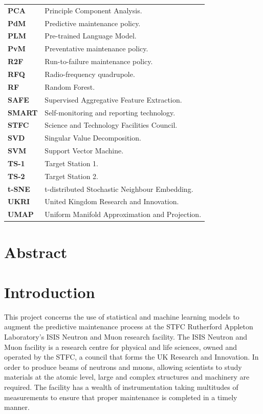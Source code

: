 \documentclass[10pt,oneside]{report}
\begin{document}
\begin{table}[ht]
\begin{tabular}{ll}
        \textbf{PCA} & Principle Component Analysis. \\
        \textbf{PdM} & Predictive maintenance policy. \\
        \textbf{PLM} & Pre-trained Language Model. \\
        \textbf{PvM} & Preventative maintenance policy. \\
        \textbf{R2F} & Run-to-failure maintenance policy. \\
        \textbf{RFQ} & Radio-frequency quadrupole. \\
        \textbf{RF} & Random Forest. \\
        \textbf{SAFE} & Supervised Aggregative Feature Extraction. \\
        \textbf{SMART} & Self-monitoring and reporting technology. \\
        \textbf{STFC} & Science and Technology Facilities Council. \\
        \textbf{SVD} & Singular Value Decomposition. \\
        \textbf{SVM} & Support Vector Machine. \\
        \textbf{TS-1} & Target Station 1. \\
        \textbf{TS-2} & Target Station 2. \\
        \textbf{t-SNE} & t-distributed Stochastic Neighbour Embedding. \\
        \textbf{UKRI} & United Kingdom Research and Innovation. \\
        \textbf{UMAP} & Uniform Manifold Approximation and Projection. \\

    \end{tabular}
\end{table}

\clearpage


\chapter*{Abstract}


\chapter{Introduction}

This project concerns the use of statistical and machine learning models to augment the predictive maintenance process at the STFC Rutherford Appleton Laboratory's ISIS Neutron and Muon research facility. The ISIS Neutron and Muon facility is a research centre for physical and life sciences, owned and operated by the STFC, a council that forms the UK Research and Innovation. In order to produce beams of neutrons and muons, allowing scientists to study materials at the atomic level, large and complex structures and machinery are required. The facility has a wealth of instrumentation taking multitudes of measurements to ensure that proper maintenance is completed in a timely manner. \\
\end{document}

